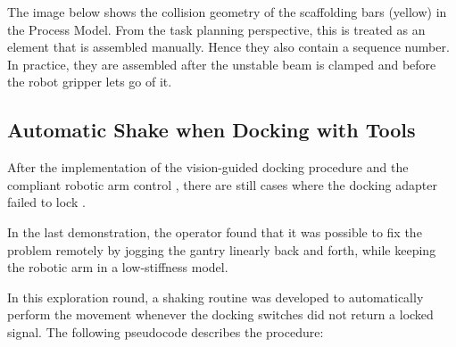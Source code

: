 The image below shows the collision geometry of the scaffolding bars (yellow) in the Process Model. From the task planning perspective, this is treated as an element that is assembled manually. Hence they also contain a sequence number. In practice, they are assembled after the unstable beam is clamped and before the robot gripper lets go of it.




\subsection{Automatic Shake when Docking with Tools}
\label{subsection:exploration-5-automatic-shake-when-docking-with-tools}

After the implementation of the vision-guided docking procedure  and the compliant robotic arm control , there are still cases where the docking adapter failed to lock .

In the last demonstration, the operator found that it was possible to fix the problem remotely by jogging the gantry linearly back and forth, while keeping the robotic arm in a low-stiffness model. 

In this exploration round, a shaking routine was developed to automatically perform the movement whenever the docking switches did not return a locked signal. The following pseudocode describes the procedure:


